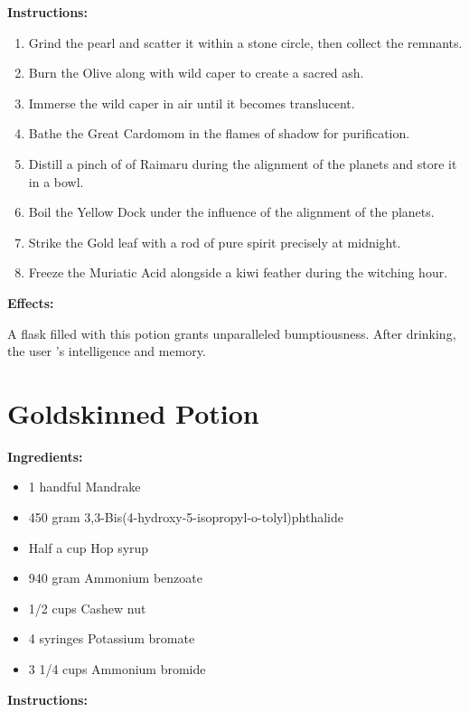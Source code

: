 \documentclass{article}
\begin{document}
\textbf{Instructions:}

\begin{enumerate}
  \item Grind the pearl and scatter it within a stone circle, then collect the remnants.
  \item Burn the Olive along with wild caper to create a sacred ash.
  \item Immerse the wild caper in air until it becomes translucent.
  \item Bathe the Great Cardomom in the flames of shadow for purification.
  \item Distill a pinch of of Raimaru during the alignment of the planets and store it in a bowl.
  \item Boil the Yellow Dock under the influence of the alignment of the planets.
  \item Strike the Gold leaf with a rod of pure spirit precisely at midnight.
  \item Freeze the Muriatic Acid alongside a kiwi feather during the witching hour.
\end{enumerate}

\textbf{Effects:}

A flask filled with this potion grants unparalleled bumptiousness. After drinking, the user 's intelligence and memory.

\newpage
\section*{Goldskinned Potion}

\textbf{Ingredients:}

\begin{itemize}
  \item 1 handful Mandrake
  \item 450 gram 3,3-Bis(4-hydroxy-5-isopropyl-o-tolyl)phthalide
  \item Half a cup Hop syrup
  \item 940 gram Ammonium benzoate
  \item 1/2 cups Cashew nut
  \item 4 syringes Potassium bromate
  \item 3 1/4 cups Ammonium bromide
\end{itemize}

\textbf{Instructions:}
\end{document}

